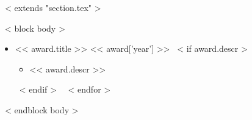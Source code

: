 ~< extends "section.tex" >~

~< block body >~
\begin{itemize}
  ~< for award in items >~
    \item << award.title >> \hfill << award['year'] >>
    ~< if award.descr >~
      \begin{itemize}
      \item << award.descr >>
      \end{itemize}
    ~< endif >~
  ~< endfor >~
\end{itemize}
~< endblock body >~
